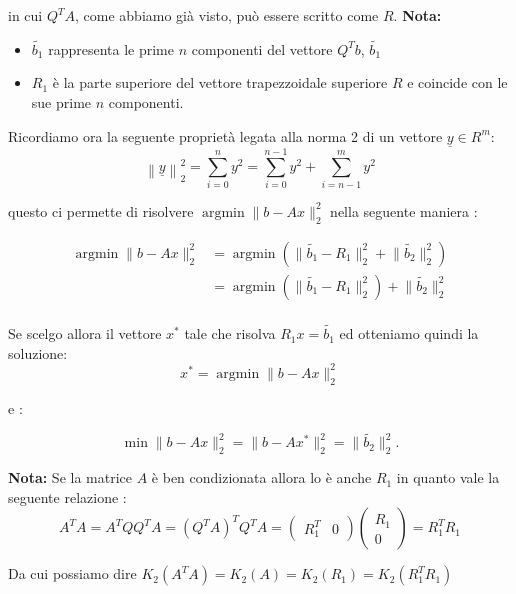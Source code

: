 \documentclass[12pt, a4paper]{book}
\theoremstyle{definition}
\newcommand{\VarMtrx}[1]{\ensuremath{\underline{#1}}}
\begin{document}
\begin{flushleft}
in cui $Q^{T}A$, come abbiamo già visto, può essere scritto come $R$.
\textbf{Nota:}
\begin{itemize}
	\item $\tilde{b_{1}}$ rappresenta le prime $n$ componenti del vettore $Q^{T}b$,  $\tilde{b_{1}}$
	\item $R_{1}$ è la parte superiore del vettore trapezzoidale superiore $R$ e coincide con le sue prime $n$ componenti. 
\end{itemize}

Ricordiamo ora la seguente proprietà legata alla norma 2 di un vettore $\VarMtrx{y} \in R^{m}$: 
\[ 
	\left\lVert \VarMtrx{y} \right\rVert^{2}_{2} = \sum^{n}_{i=0} y^{2} = \sum^{n-1}_{i=0} y^{2} +  \sum^{m}_{i=n-1} y^{2}
\]

questo ci permette di risolvere $ \operatorname*{argmin} \lVert b - Ax  \rVert ^ {2} _{2}$ nella seguente maniera : 

\[ 
	\begin{split}
 		\operatorname*{argmin}  \lVert b - Ax  \rVert ^ {2} _{2} &=  \operatorname*{argmin} ( \lVert  \tilde{b_{1}} - R_{1}  \rVert ^ {2} _{2}  + \lVert  \tilde{b_{2}} \rVert ^ {2} _{2}) \\
 		&=    \operatorname*{argmin} ( \lVert  \tilde{b_{1}} - R_{1}  \rVert ^ {2} _{2})  + \lVert  \tilde{b_{2}} \rVert ^ {2} _{2}\\
 	\end{split}
\]


Se scelgo allora il vettore $x^{*}$ tale che risolva $R_{1}x = \tilde{b_{1}}$ ed otteniamo quindi la soluzione:
\[
	 x^{*} =  \operatorname*{argmin}  \lVert b - Ax  \rVert ^ {2} _{2}
\] 

e : 

\[ 
	\min \lVert b - Ax  \rVert ^ {2} _{2} =   \lVert b - Ax^{*} \rVert ^ {2} _{2} = \lVert  \tilde{b_{2}} \rVert ^ {2} _{2}.
\]


\textbf{Nota:} Se la matrice $A$ è ben condizionata allora lo è anche $R_{1}$ in quanto vale la seguente relazione :
\[ 
	A^{T}A = A^{T}QQ^{T}A = (Q^{T}A)^{T}Q^{T}A = \begin{pmatrix} R_{1}^{T} & 0 \end{pmatrix} \begin{pmatrix} R_{1} \\ 0 \end{pmatrix} = R_{1}^{T}R_{1}
\]

Da cui possiamo dire $K_{2}(A^{T}A) = K_{2}(A) = K_{2}(R_{1}) =  K_{2}(R_{1}^{T}R_{1})$
\end{flushleft}
\end{document}
